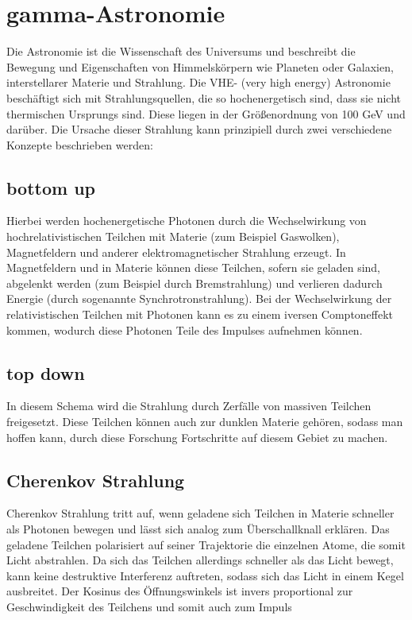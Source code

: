 \chapter{gamma-Astronomie}
Die Astronomie ist die Wissenschaft des Universums und beschreibt die Bewegung und Eigenschaften von Himmelskörpern wie Planeten oder Galaxien, interstellarer Materie und Strahlung. Die VHE- (very high energy) Astronomie beschäftigt sich mit Strahlungsquellen, die so hochenergetisch sind, dass sie nicht thermischen Ursprungs sind. Diese liegen in der Größenordnung von 100 GeV und darüber.%
Die Ursache dieser Strahlung kann prinzipiell durch zwei verschiedene Konzepte beschrieben werden:
\section{bottom up}
Hierbei werden hochenergetische Photonen durch die Wechselwirkung von hochrelativistischen Teilchen mit Materie (zum Beispiel Gaswolken), Magnetfeldern und anderer elektromagnetischer Strahlung erzeugt. In Magnetfeldern und in Materie können diese Teilchen, sofern sie geladen sind, abgelenkt werden (zum Beispiel durch Bremstrahlung) und verlieren dadurch Energie (durch sogenannte Synchrotronstrahlung). Bei der Wechselwirkung der relativistischen Teilchen mit Photonen kann es zu einem iversen Comptoneffekt kommen, wodurch diese Photonen Teile des Impulses aufnehmen können.
\section{top down}
In diesem Schema wird die Strahlung durch Zerfälle von massiven Teilchen freigesetzt. Diese Teilchen können auch zur dunklen Materie gehören, sodass man hoffen kann, durch diese Forschung Fortschritte auf diesem Gebiet zu machen.

\section{Cherenkov Strahlung}
Cherenkov Strahlung tritt auf, wenn geladene sich Teilchen in Materie schneller als Photonen bewegen und lässt sich analog zum Überschallknall erklären. Das geladene Teilchen polarisiert auf seiner Trajektorie die einzelnen Atome, die somit Licht abstrahlen. Da sich das Teilchen allerdings schneller als das Licht bewegt, kann keine destruktive Interferenz auftreten, sodass sich das Licht in einem Kegel ausbreitet. Der Kosinus des Öffnungswinkels ist invers proportional zur Geschwindigkeit des Teilchens und somit auch zum Impuls